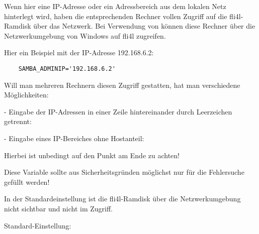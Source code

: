\begin{description}

        Wenn hier eine IP-Adresse oder ein Adressbereich aus dem lokalen Netz
        hinterlegt wird, haben die entsprechenden Rechner vollen Zugriff auf
        die fli4l-Ramdisk über das Netzwerk.
        Bei Verwendung von  können diese Rechner über die
        Netzwerkumgebung von Windows auf fli4l zugreifen.

        Hier ein Beispiel mit der IP-Adresse 192.168.6.2:

\begin{example}
\begin{verbatim}
    SAMBA_ADMINIP='192.168.6.2'
\end{verbatim}
\end{example}

        Will man mehreren Rechnern diesen Zugriff gestatten, hat man
        verschiedene Möglichkeiten:

        - Eingabe der IP-Adressen in einer Zeile hintereinander
          durch Leerzeichen getrennt:


        - Eingabe eines IP-Bereiches ohne Hostanteil:


          Hierbei ist unbedingt auf den Punkt am Ende zu achten!

        Diese Variable sollte aus Sicherheitsgründen möglichst nur für die
        Fehlersuche gefüllt werden!

        In der Standardeinstellung ist die fli4l-Ramdisk über die
        Netzwerkumgebung nicht sichtbar und nicht im Zugriff.

        Standard-Einstellung: 
\end{description}

